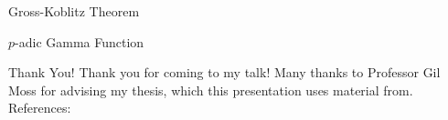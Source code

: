 \documentclass[presentation]{beamer}
\begin{document}
\begin{frame}{Gross-Koblitz Theorem}

\end{frame}

\begin{frame}{$p$-adic Gamma Function}

\end{frame}

\begin{frame}{Thank You!}
Thank you for coming to my talk! Many thanks to Professor Gil Moss for advising my thesis, which this presentation uses material from.\\
\medskip
References:
\medskip
    

\end{frame}
\end{document}
